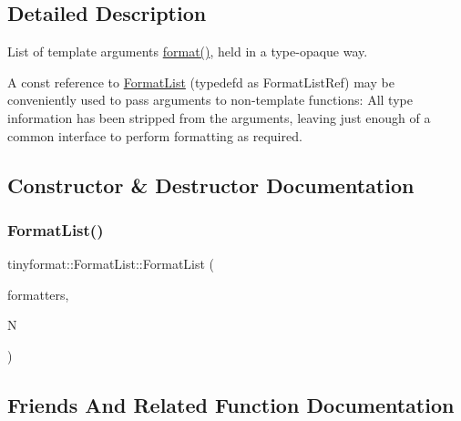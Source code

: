 \subsection{Detailed Description}
List of template arguments \mbox{\hyperlink{namespacetinyformat_adc3e74768f0e2204f9f9a726fc07ec61}{format()}}, held in a type-\/opaque way.

A const reference to \mbox{\hyperlink{classtinyformat_1_1_format_list}{Format\+List}} (typedef\textquotesingle{}d as Format\+List\+Ref) may be conveniently used to pass arguments to non-\/template functions\+: All type information has been stripped from the arguments, leaving just enough of a common interface to perform formatting as required. 

\subsection{Constructor \& Destructor Documentation}
\mbox{\label{classtinyformat_1_1_format_list_a4dc93948fa7b945665800b5c147037c3}} 
\subsubsection{\texorpdfstring{Format\+List()}{FormatList()}}
{\footnotesize\ttfamily tinyformat\+::\+Format\+List\+::\+Format\+List (\begin{DoxyParamCaption}\item[{\mbox{\hyperlink{classtinyformat_1_1detail_1_1_format_arg}{detail\+::\+Format\+Arg}} $\ast$}]{formatters,  }\item[{int}]{N }\end{DoxyParamCaption})\hspace{0.3cm}{\ttfamily [inline]}}



\subsection{Friends And Related Function Documentation}
\mbox{\label{classtinyformat_1_1_format_list_a105eb7b498f1353f8da108bd7284af58}} 
